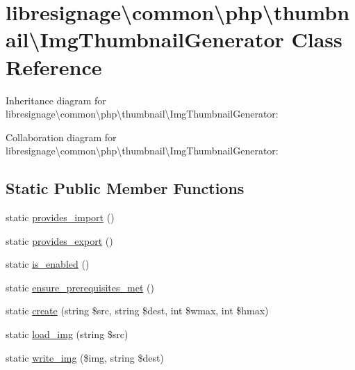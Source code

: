 \hypertarget{classlibresignage_1_1common_1_1php_1_1thumbnail_1_1ImgThumbnailGenerator}{}\section{libresignage\textbackslash{}common\textbackslash{}php\textbackslash{}thumbnail\textbackslash{}Img\+Thumbnail\+Generator Class Reference}
\label{classlibresignage_1_1common_1_1php_1_1thumbnail_1_1ImgThumbnailGenerator}


Inheritance diagram for libresignage\textbackslash{}common\textbackslash{}php\textbackslash{}thumbnail\textbackslash{}Img\+Thumbnail\+Generator\+:


Collaboration diagram for libresignage\textbackslash{}common\textbackslash{}php\textbackslash{}thumbnail\textbackslash{}Img\+Thumbnail\+Generator\+:
\subsection*{Static Public Member Functions}
\begin{DoxyCompactItemize}
\item 
static \hyperlink{classlibresignage_1_1common_1_1php_1_1thumbnail_1_1ImgThumbnailGenerator_a3fc7c9aedf448fcc6959ce18ffca35cb}{provides\+\_\+import} ()
\item 
static \hyperlink{classlibresignage_1_1common_1_1php_1_1thumbnail_1_1ImgThumbnailGenerator_a03672f0562ba75288c0a1774642b0b70}{provides\+\_\+export} ()
\item 
static \hyperlink{classlibresignage_1_1common_1_1php_1_1thumbnail_1_1ImgThumbnailGenerator_aa14a97c25ae6f9dc918df6b290b8e4a0}{is\+\_\+enabled} ()
\item 
static \hyperlink{classlibresignage_1_1common_1_1php_1_1thumbnail_1_1ImgThumbnailGenerator_aaf9ec891b0098f04280029338054438d}{ensure\+\_\+prerequisites\+\_\+met} ()
\item 
static \hyperlink{classlibresignage_1_1common_1_1php_1_1thumbnail_1_1ImgThumbnailGenerator_aa988f6ec383e43ddf2d1c017e1a0af4f}{create} (string \$src, string \$dest, int \$wmax, int \$hmax)
\item 
static \hyperlink{classlibresignage_1_1common_1_1php_1_1thumbnail_1_1ImgThumbnailGenerator_a79f70183e0bfdba3e0f9afe45ba0bb8d}{load\+\_\+img} (string \$src)
\item 
static \hyperlink{classlibresignage_1_1common_1_1php_1_1thumbnail_1_1ImgThumbnailGenerator_a12a12f8a06bd74996dae867a7918266a}{write\+\_\+img} (\$img, string \$dest)
\end{DoxyCompactItemize}



